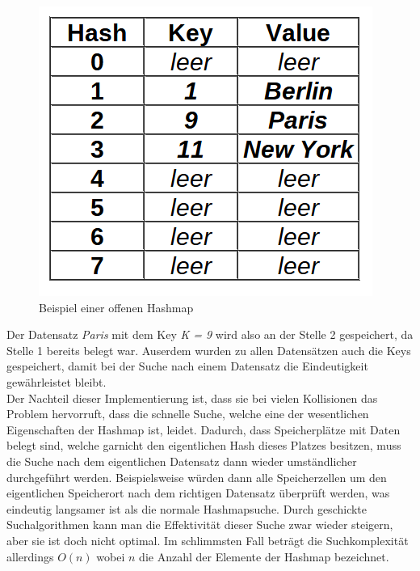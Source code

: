 \documentclass[11pt,a4paper]{article}
\begin{document}
\begin{figure}[h]
    \centering
    \includegraphics[scale=0.5]{Bilder/Hashmap_example_open.PNG}
    \caption[Bild 1:]{Beispiel einer offenen Hashmap}
     
\end{figure}
Der Datensatz \textit{Paris} mit dem Key \textit{K = 9} wird also an der Stelle 2 gespeichert, da Stelle 1 bereits belegt war.
Auserdem wurden zu allen Datensätzen auch die Keys gespeichert, damit bei der Suche nach einem Datensatz die Eindeutigkeit gewährleistet bleibt.\\
Der Nachteil dieser Implementierung ist, dass sie bei vielen Kollisionen das Problem hervorruft, dass die schnelle Suche, welche eine der wesentlichen Eigenschaften der Hashmap ist, leidet.
Dadurch, dass Speicherplätze mit Daten belegt sind, welche garnicht den eigentlichen Hash dieses Platzes besitzen, muss die Suche nach dem eigentlichen Datensatz dann wieder umständlicher durchgeführt werden.
Beispielsweise würden dann alle Speicherzellen um den eigentlichen Speicherort nach dem richtigen Datensatz überprüft werden, was eindeutig langsamer ist als die normale Hashmapsuche.
Durch geschickte Suchalgorithmen kann man die Effektivität dieser Suche zwar wieder steigern, aber sie ist doch nicht optimal.
Im schlimmsten Fall beträgt die Suchkomplexität allerdings $O(n)$ wobei $n$ die Anzahl der Elemente der Hashmap bezeichnet.
\end{document}
